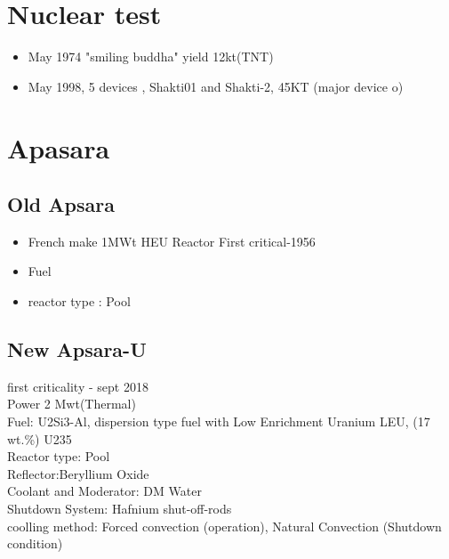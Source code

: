 \documentclass[10pt,a4paper]{article}
\begin{document}
\section{Nuclear test}
\begin{itemize}
	\item May 1974 "smiling buddha" yield 12kt(TNT)
	\item May 1998, 5 devices , Shakti01 and Shakti-2, 45KT (major device o)
\end{itemize}
\section{Apasara}
\subsection{Old Apsara}
\begin{itemize}
	\item French make 1MWt HEU Reactor First critical-1956
	\item Fuel
	\item reactor type : Pool
\end{itemize}

\subsection{New Apsara-U}
first criticality - sept 2018\\
Power 2 Mwt(Thermal)\\
Fuel: U2Si3-Al,  dispersion type fuel with Low Enrichment Uranium LEU,  (17 wt.\%) U235\\
Reactor type: Pool\\
Reflector:Beryllium Oxide\\
Coolant and Moderator: DM Water\\
Shutdown System: Hafnium shut-off-rods\\
coolling method: Forced convection (operation), Natural Convection (Shutdown condition)
\end{document}
